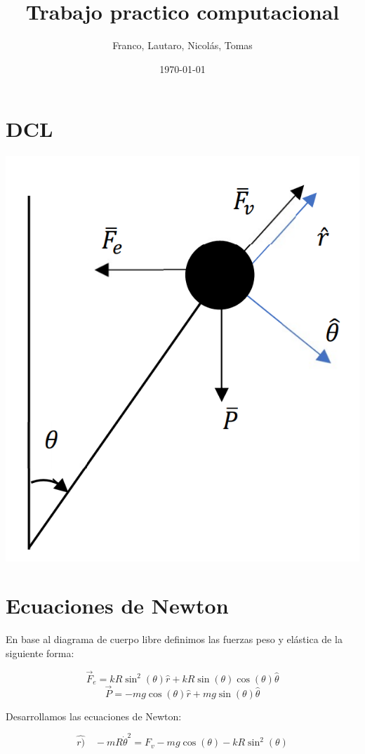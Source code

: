 \documentclass{article}
\title{Trabajo practico computacional}
\author{Franco, Lautaro, Nicol\'as, Tomas}
\date{\today}
\begin{document}
    \maketitle
    
    \section{DCL}
    
    \includegraphics[scale=0.3]{DCL.png}
    
    \section{Ecuaciones de Newton}
    
    En base al diagrama de cuerpo libre definimos las fuerzas peso y el\'astica de la siguiente forma:
    
	$$\vec{F}_e = kR \sin^2{(\theta)} \hat{r} + kR \sin{(\theta)}\cos{(\theta)} \hat{\theta}$$
	$$\vec{P} = -mg \cos{(\theta)} \hat{r} + mg \sin {(\theta)} \hat{\theta} $$
	
	Desarrollamos las ecuaciones de Newton:
	
	\begin{equation}
	\label{eqn:equationr}
		\hat{r)} \quad -mR\dot{\theta}^2 = F_v - mg \cos{(\theta)} - kR \sin^2{(\theta)}
	\end{equation}
    
\end{document}
